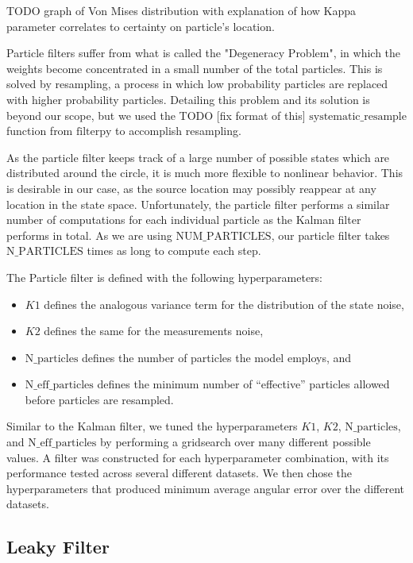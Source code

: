 \documentclass[11pt]{amsart}
\begin{document}
TODO graph of Von Mises distribution with explanation of how Kappa parameter 
correlates to certainty on particle's location.

Particle filters suffer from what is called the "Degeneracy Problem", in which the weights become concentrated in a small number of the total particles. This is solved by resampling, a process in which low probability particles are replaced 
with higher probability particles. Detailing this problem and its solution is beyond our scope, but we used the TODO [fix format of this] $\text{systematic\_resample}$ function from $\text{filterpy}$ to accomplish resampling.

As the particle filter keeps track of a large number of possible states which are distributed around the circle, it is much more flexible to nonlinear behavior. This is desirable in our case, as the source location may possibly reappear at any 
location in the state space. Unfortunately, the particle filter performs a similar number of computations for each individual particle as the Kalman filter performs in total. As we are using $\text{NUM\_PARTICLES}$, our particle filter takes $\text{N\_PARTICLES}$ 
times as long to compute each step.

The Particle filter is defined with the following hyperparameters: 
\begin{itemize}
    \item $K1$ defines the analogous variance term for the distribution of the state noise,
    \item $K2$ defines the same for the measurements noise,
    \item $\text{N\_particles}$ defines the number of particles the model employs, and
    \item $\text{N\_eff\_particles}$ defines the minimum number of “effective” particles allowed before particles are resampled.
\end{itemize}

Similar to the Kalman filter, we tuned the hyperparameters $K1$, $K2$, $\text{N\_particles}$, and $\text{N\_eff\_particles}$ by performing a gridsearch over many different possible values. A filter was constructed for each hyperparameter combination, with its performance 
tested across several different datasets. We then chose the hyperparameters that produced minimum average angular error over the different datasets. 

\subsection{Leaky Filter}
\end{document}
